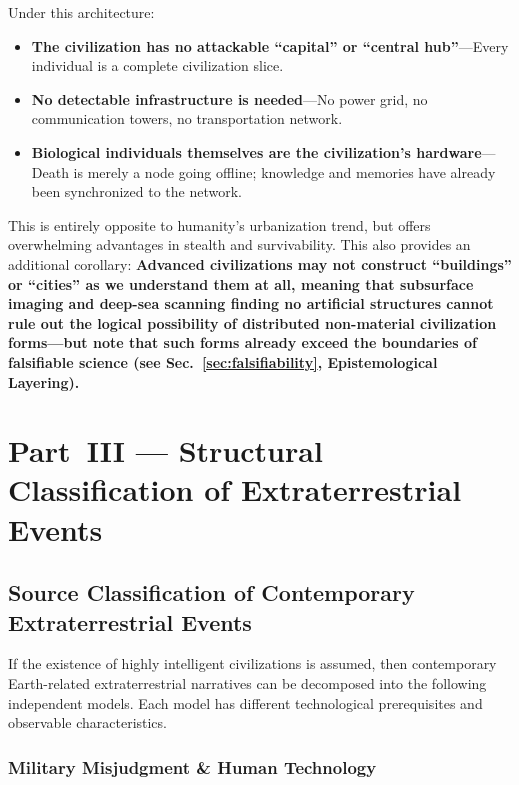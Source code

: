 \documentclass[aps,prd,twocolumn,superscriptaddress,nofootinbib]{revtex4-2}
\begin{document}
Under this architecture:

\begin{itemize}
  \item \textbf{The civilization has no attackable ``capital'' or ``central hub''}---Every individual is a complete civilization slice.
  \item \textbf{No detectable infrastructure is needed}---No power grid, no communication towers, no transportation network.
  \item \textbf{Biological individuals themselves are the civilization's hardware}---Death is merely a node going offline; knowledge and memories have already been synchronized to the network.
\end{itemize}

This is entirely opposite to humanity's urbanization trend, but offers overwhelming advantages in stealth and survivability. This also provides an additional corollary: \textbf{Advanced civilizations may not construct ``buildings'' or ``cities'' as we understand them at all, meaning that subsurface imaging and deep-sea scanning finding no artificial structures cannot rule out the logical possibility of distributed non-material civilization forms---but note that such forms already exceed the boundaries of falsifiable science (see Sec.~\ref{sec:falsifiability}, Epistemological Layering).}


\section{Part~III --- Structural Classification of Extraterrestrial Events}\label{sec:part3}

\subsection{Source Classification of Contemporary Extraterrestrial Events}\label{sec:source-classification}

If the existence of highly intelligent civilizations is assumed, then contemporary Earth-related extraterrestrial narratives can be decomposed into the following independent models. Each model has different technological prerequisites and observable characteristics.

\subsubsection{Military Misjudgment \& Human Technology}\label{sec:military}
\end{document}
